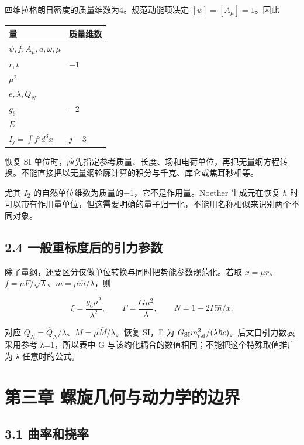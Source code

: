 \documentclass[UTF8,fontset=fandol,11pt]{ctexart}
\begin{document}
四维拉格朗日密度的质量维数为4。规范动能项决定 \([\psi]=[A_\mu]=1\)。因此

\begin{center}\small
\begin{tabularx}{\textwidth}{>{\raggedright\arraybackslash}X>{\raggedright\arraybackslash}X}
\toprule
量 & 质量维数 \\
\midrule
\(\psi,f,A_\mu,a,\omega,\mu\) & 1 \\
\(r,t\) & −1 \\
\(\mu^2\) & 2 \\
\(e,\lambda,Q_N\) & 0 \\
\(g_6\) & −2 \\
\(E\) & 1 \\
\(I_j=\int f^j d^3x\) & \(j-3\) \\
\bottomrule
\end{tabularx}
\end{center}

恢复 SI 单位时，应先指定参考质量、长度、场和电荷单位，再把无量纲方程转换。不能直接把以无量纲轮廓计算的积分与千克、库仑或焦耳秒相等。

尤其 \(I_2\) 的自然单位维数为质量的−1，它不是作用量。Noether 生成元在恢复 \(\hbar\) 时可以带有作用量单位，但这需要明确的量子归一化，不能用名称相似来识别两个不同对象。

\subsection*{2.4 一般重标度后的引力参数}

除了量纲，还要区分仅做单位转换与同时把势能参数规范化。若取 \(x=\mu r\)、\(f=\mu F/\sqrt\lambda\)、\(m=\mu\widehat m/\lambda\)，则

\[
\xi=\frac{g_6\mu^2}{\lambda^2},\qquad
\Gamma=\frac{G\mu^2}{\lambda},\qquad
N=1-2\Gamma\widehat m/x.
\tag{2.5}
\]

对应 \(Q_N=\widehat Q_N/\lambda\)、\(M=\mu\widehat M/\lambda\)。恢复 SI，Γ 为 \(G_{\rm SI}m_{\rm ref}^2/(\lambda\hbar c)\)。后文自引力数表采用参考 λ=1，所以表中 G 与该约化耦合的数值相同；不能把这个特殊取值推广为 λ 任意时的公式。

\section*{第三章 螺旋几何与动力学的边界}


\subsection*{3.1 曲率和挠率}
\end{document}
